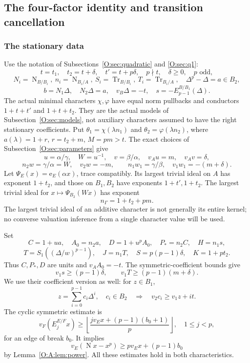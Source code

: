 \documentclass[11pt]{amsart}
\theoremstyle{definition}
\theoremstyle{remark}
\newcommand{\Tr}{\operatorname{Tr}}
\newcommand{\Nm}{\operatorname{N}}
\newcommand{\floor}[1]{\left\lfloor #1\right\rfloor}
\newcommand{\ee}{\mathrm e}\newcommand{\echar}{\mathrm e}\newcommand{\FF}{\mathbf F}
\begin{document}
\subsection{The four-factor identity and transition cancellation}\label{O:sec:transition}
\subsubsection*{The stationary data}
Use the notation of Subsections~\ref{O:sec:quadratic} and \ref{O:sec:q1}:
\[
 t=t_1,\quad t_2=t+\delta,\quad t'=t+p\delta,\quad p\nmid t,
 \quad \delta\ge0,\quad p\text{ odd},
\]
\[
 N_i=\Nm_{B/B_i},\ n_i=\Nm_{B_i/A},\ S_i=\Tr_{B/B_i},\
 T_i=\Tr_{B_i/A},\quad \Delta^p-\Delta=a\in B_2,
\]
\[
 b=N_1\Delta,\quad N_2\Delta=a,\quad v_B\Delta=-t,
 \quad s=-E_{p-1}^{B/B_1}(\Delta).
\]
The actual minimal characters $\chi,\varphi$ have equal norm pullbacks
and conductors $1+t+t'$ and $1+t+t_2$. They are the actual models of
Subsection~\ref{O:sec:models}, not auxiliary characters assumed to have the right
stationary coefficients. Put $\theta_1=\chi(\lambda n_1)$ and
$\theta_2=\varphi(\lambda n_2)$, where $a(\lambda)=1+r$,
$r=t_2+m$, $M=pm>t$. The exact choices of Subsection~\ref{O:sec:parameters} give
\[
 u=\alpha/\gamma,\quad W=u^{-1},\quad v=\beta/\alpha,
 \quad v_Au=m,\quad v_Av=\delta,
\]
\[
 n_2w=\gamma/\alpha=W,\quad v_2w=-m,\qquad
 n_1w_1=\gamma/\beta,\quad v_1w_1=-(m+\delta).
\]
Let $\Psi_E(x)=\ee_E(\alpha x)$, trace compatibly. Its largest trivial
ideal on $A$ has exponent $1+t_2$, and those on $B_1,B_2$ have
exponents $1+t',1+t_2$. The largest trivial ideal for
$x\mapsto\Psi_{B_2}(Wx)$ has exponent
\begin{equation}\label{O:T:Gammacond}
 n_\Gamma=1+t_2+pm.
\end{equation}
The largest trivial ideal of an additive character is not generally
its entire kernel; no converse valuation inference from a single
character value will be used.

Set
\[
 C=1+ua,\quad A_0=n_2a,\quad D=1+u^pA_0,
 \quad P_*=n_2C,\quad H=n_1s,
\]
\[
 T=S_1((\Delta/w)^{p-1}),\quad J=n_1T,\quad
 S=p(p-1)\delta,\quad K=1+pt_2.
\]
Thus $C,P_*,D$ are units and $v_AA_0=-t$.
The symmetric-coefficient bounds give
\begin{equation}\label{O:T:sT}
 v_1s\ge(p-1)\delta,\qquad v_1T\ge(p-1)(m+\delta).
\end{equation}
We use their coefficient version as well: for $z\in B_1$,
\begin{equation}\label{O:T:coefficient}
 z=\sum_{i=0}^{p-1}c_i\Delta^i,
 \quad c_i\in B_2\quad\Longrightarrow\quad
 v_2c_i\ge v_1z+it.
\end{equation}
The cyclic symmetric estimate is
\begin{equation}\label{O:T:sym}
 v_F(E_j^{E/F}x)\ge
 \floor{\frac{jv_Ex+(p-1)(b_0+1)}p},\quad1\le j<p,
\end{equation}
for an edge of break $b_0$. It implies
\begin{equation}\label{O:T:np}
 v_E(\Nm x-x^p)\ge p v_Ex+(p-1)b_0
\end{equation}
by Lemma~\ref{O:A:lem:power}.
All these estimates hold in both characteristics.
\end{document}
